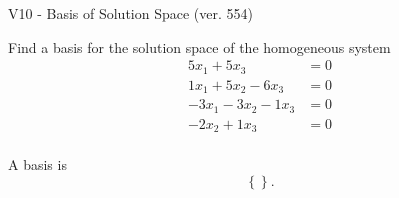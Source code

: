 \begin{exercise}
  \begin{exerciseTitle}V10 - Basis of Solution Space (ver. 554)\end{exerciseTitle}
  \begin{exerciseStatement}
    Find a basis for the solution space of the homogeneous system 
\begin{align*}
 5 x_ 1 + 5 x_ 3 &= 0  \\ 
  1 x_ 1 + 5 x_ 2 -6 x_ 3 &= 0  \\ 
  -3 x_ 1 -3 x_ 2 -1 x_ 3 &= 0  \\ 
  -2 x_ 2 + 1 x_ 3 &= 0  \\ 
 \end{align*}


 
  \end{exerciseStatement}

  \begin{exerciseAnswer}
   A basis is   
\[\left\{\right\}.\]

  


  \end{exerciseAnswer}
\end{exercise}